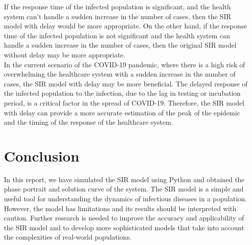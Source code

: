 \documentclass{article}
\begin{document}
\begin{enumerate}
 If the response time of the infected population is significant, and the health system can't handle a sudden increase in the number of cases, then the SIR model with delay would be more appropriate. On the other hand, if the response time of the infected population is not significant and the health system can handle a sudden increase in the number of cases, then the original SIR model without delay may be more appropriate.
\\
In the current scenario of the COVID-19 pandemic, where there is a high risk of overwhelming the healthcare system with a sudden increase in the number of cases, the SIR model with delay may be more beneficial. The delayed response of the infected population to the infection, due to the lag in testing or incubation period, is a critical factor in the spread of COVID-19. Therefore, the SIR model with delay can provide a more accurate estimation of the peak of the epidemic and the timing of the response of the healthcare system.

\end{enumerate}

\section{Conclusion}
In this report, we have simulated the SIR model using Python and obtained the phase portrait and solution curve of the system. The SIR model is a simple and useful tool for understanding the dynamics of infectious diseases in a population. However, the model has limitations and its results should be interpreted with caution. Further research is needed to improve the accuracy and applicability of the SIR model and to develop more sophisticated models that take into account the complexities of real-world populations.


\cite{kermack1927contribution,brauer2017mathematical,hethcote2000mathematics,allen2007introduction,keeling2008modeling}
\end{document}
